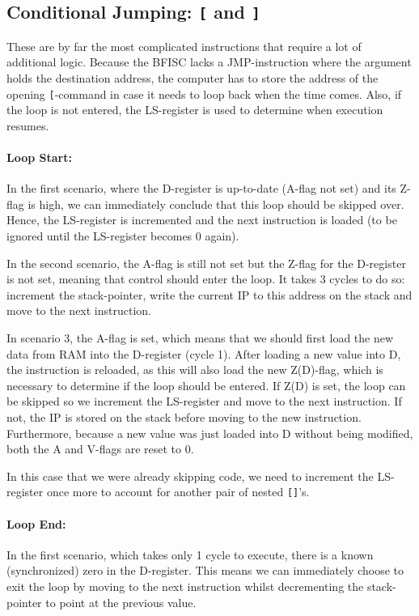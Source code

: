 \subsection{Conditional Jumping: \texttt{[} and \texttt{]}}
These are by far the most complicated instructions that require a lot of additional logic. Because the BFISC lacks a JMP-instruction where the argument holds the destination address, the computer has to store the address of the opening \texttt{[}-command in case it needs to loop back when the time comes. Also, if the loop is not entered, the LS-register is used to determine when execution resumes.

\paragraph{Loop Start:}  
In the first scenario, where the D-register is up-to-date (A-flag not set) and its Z-flag is high, we can immediately conclude that this loop should be skipped over. Hence, the LS-register is incremented and the next instruction is loaded (to be ignored until the LS-register becomes 0 again).

In the second scenario, the A-flag is still not set but the Z-flag for the D-register is not set, meaning that control should enter the loop. It takes 3 cycles to do so: increment the stack-pointer, write the current IP to this address on the stack and move to the next instruction.

In scenario 3, the A-flag is set, which means that we should first load the new data from RAM into the D-register (cycle 1). After loading a new value into D, the instruction is reloaded, as this will also load the new Z(D)-flag, which is necessary to determine if the loop should be entered. If Z(D) is set, the loop can be skipped so we increment the LS-register and move to the next instruction. If not, the IP is stored on the stack before moving to the new instruction. Furthermore, because a new value was just loaded into D without being modified, both the A and V-flags are reset to 0.

In this case that we were already skipping code, we need to increment the LS-register once more to account for another pair of nested \texttt{[]}'s.

\paragraph{Loop End:}
In the first scenario, which takes only 1 cycle to execute, there is a known (synchronized) zero in the D-register. This means we can immediately choose to exit the loop by moving to the next instruction whilst decrementing the stack-pointer to point at the previous value.

